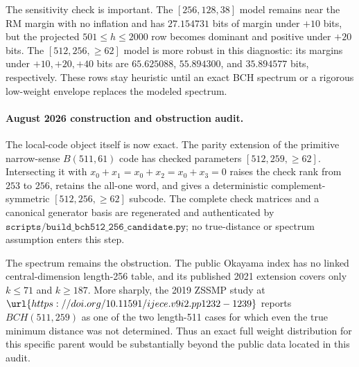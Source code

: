 The sensitivity check is important.  The \([256,128,38]\) model remains near the RM margin with no inflation and
has \(27.154731\) bits of margin under \(+10\) bits, but the projected \(501\le h\le2000\) row becomes dominant and
positive under \(+20\) bits.  The \([512,256,\ge62]\) model is more robust in this diagnostic: its margins under
\(+10,+20,+40\) bits are \(65.625088\), \(55.894300\), and \(35.894577\) bits, respectively.  These rows stay heuristic
until an exact BCH spectrum or a rigorous low-weight envelope replaces the modeled spectrum.

\paragraph{August 2026 construction and obstruction audit.}
The local-code object itself is now exact.  The parity extension of the primitive narrow-sense
\(B(511,61)\) code has checked parameters \([512,259,\ge62]\).  Intersecting it with
\(x_0+x_1=x_0+x_2=x_0+x_3=0\) raises the check rank from \(253\) to \(256\), retains the all-one word, and gives a
deterministic complement-symmetric \([512,256,\ge62]\) subcode.  The complete check matrices and a canonical
generator basis are regenerated and authenticated by
\(\texttt{scripts/build\_bch512\_256\_candidate.py}\); no true-distance or spectrum assumption enters this step.

The spectrum remains the obstruction.  The public Okayama index has no linked central-dimension length-256 table,
and its published 2021 extension covers only \(k\le71\) and \(k\ge187\).  More sharply, the 2019 ZSSMP study at
\(\url{https://doi.org/10.11591/ijece.v9i2.pp1232-1239}\) reports \(BCH(511,259)\) as one of the two length-511
cases for which even the true minimum distance was not determined.  Thus an exact full weight distribution for this
specific parent would be substantially beyond the public data located in this audit.

